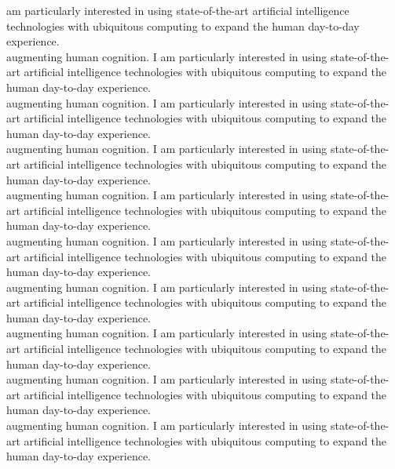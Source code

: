 \documentclass[a4paper,10pt]{article}
\begin{document}
{\begin{minipage}[t]{0.60\textwidth}
    am particularly interested in using state-of-the-art artificial
    intelligence technologies with ubiquitous computing to expand the
    human day-to-day experience.\\ augmenting human cognition. I
    am particularly interested in using state-of-the-art artificial
    intelligence technologies with ubiquitous computing to expand the
    human day-to-day experience.\\ augmenting human cognition. I
    am particularly interested in using state-of-the-art artificial
    intelligence technologies with ubiquitous computing to expand the
    human day-to-day experience.\\ augmenting human cognition. I
    am particularly interested in using state-of-the-art artificial
    intelligence technologies with ubiquitous computing to expand the
    human day-to-day experience.\\ augmenting human cognition. I
    am particularly interested in using state-of-the-art artificial
    intelligence technologies with ubiquitous computing to expand the
    human day-to-day experience.\\ augmenting human cognition. I
    am particularly interested in using state-of-the-art artificial
    intelligence technologies with ubiquitous computing to expand the
    human day-to-day experience.\\ augmenting human cognition. I
    am particularly interested in using state-of-the-art artificial
    intelligence technologies with ubiquitous computing to expand the
    human day-to-day experience.\\ augmenting human cognition. I
    am particularly interested in using state-of-the-art artificial
    intelligence technologies with ubiquitous computing to expand the
    human day-to-day experience.\\ augmenting human cognition. I
    am particularly interested in using state-of-the-art artificial
    intelligence technologies with ubiquitous computing to expand the
    human day-to-day experience.\\ augmenting human cognition. I
    am particularly interested in using state-of-the-art artificial
    intelligence technologies with ubiquitous computing to expand the
    human day-to-day experience.\\
  \end{minipage}}
\end{document}
